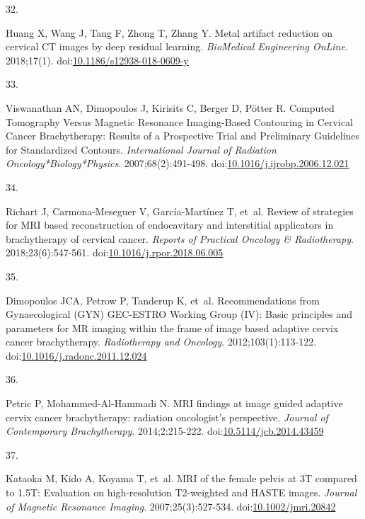 \documentclass[
  a4paper,
]{scrreprt}
\newlength{\cslhangindent}
\newlength{\csllabelwidth}
\newlength{\cslentryspacingunit} %
\newenvironment{CSLReferences}[2] %
 {%
  \setlength{\parindent}{0pt}
  \ifodd #1
  \let\oldpar\par
  \def\par{\hangindent=\cslhangindent\oldpar}
  \fi
  \setlength{\parskip}{#2\cslentryspacingunit}
 }%
 {}
\newcommand{\CSLLeftMargin}[1]{\parbox[t]{\csllabelwidth}{#1}}
\newcommand{\CSLRightInline}[1]{\parbox[t]{\linewidth - \csllabelwidth}{#1}\break}
\begin{document}
\begin{CSLReferences}{0}{0}
\leavevmode{}%
\CSLLeftMargin{32. }%
\CSLRightInline{Huang X, Wang J, Tang F, Zhong T, Zhang Y. Metal
artifact reduction on cervical CT images by deep residual learning.
\emph{BioMedical Engineering OnLine}. 2018;17(1).
doi:\href{https://doi.org/10.1186/s12938-018-0609-y}{10.1186/s12938-018-0609-y}}

\leavevmode{}%
\CSLLeftMargin{33. }%
\CSLRightInline{Viswanathan AN, Dimopoulos J, Kirisits C, Berger D,
Pötter R. Computed Tomography Versus Magnetic Resonance Imaging-Based
Contouring in Cervical Cancer Brachytherapy: Results of a Prospective
Trial and Preliminary Guidelines for Standardized Contours.
\emph{International Journal of Radiation Oncology*Biology*Physics}.
2007;68(2):491-498.
doi:\href{https://doi.org/10.1016/j.ijrobp.2006.12.021}{10.1016/j.ijrobp.2006.12.021}}

\leavevmode{}%
\CSLLeftMargin{34. }%
\CSLRightInline{Richart J, Carmona-Meseguer V, García-Martínez T, et~al.
Review of strategies for MRI based reconstruction of endocavitary and
interstitial applicators in brachytherapy of cervical cancer.
\emph{Reports of Practical Oncology \& Radiotherapy}.
2018;23(6):547-561.
doi:\href{https://doi.org/10.1016/j.rpor.2018.06.005}{10.1016/j.rpor.2018.06.005}}

\leavevmode{}%
\CSLLeftMargin{35. }%
\CSLRightInline{Dimopoulos JCA, Petrow P, Tanderup K, et~al.
Recommendations from Gynaecological (GYN) GEC-ESTRO Working Group (IV):
Basic principles and parameters for MR imaging within the frame of image
based adaptive cervix cancer brachytherapy. \emph{Radiotherapy and
Oncology}. 2012;103(1):113-122.
doi:\href{https://doi.org/10.1016/j.radonc.2011.12.024}{10.1016/j.radonc.2011.12.024}}

\leavevmode{}%
\CSLLeftMargin{36. }%
\CSLRightInline{Petric P, Mohammed-Al-Hammadi N. MRI findings at image
guided adaptive cervix cancer brachytherapy: radiation oncologist{'}s
perspective. \emph{Journal of Contemporary Brachytherapy}.
2014;2:215-222.
doi:\href{https://doi.org/10.5114/jcb.2014.43459}{10.5114/jcb.2014.43459}}

\leavevmode{}%
\CSLLeftMargin{37. }%
\CSLRightInline{Kataoka M, Kido A, Koyama T, et~al. MRI of the female
pelvis at 3T compared to 1.5T: Evaluation on high-resolution T2-weighted
and HASTE images. \emph{Journal of Magnetic Resonance Imaging}.
2007;25(3):527-534.
doi:\href{https://doi.org/10.1002/jmri.20842}{10.1002/jmri.20842}}


\end{CSLReferences}
\end{document}
